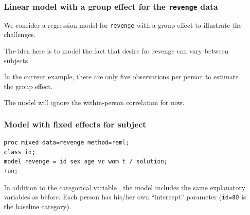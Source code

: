\documentclass{beamer}
\begin{document}
\begin{frame}
\frametitle{Linear model with a group effect for the \texttt{revenge} data}
We consider a regression model for \texttt{revenge} with a group effect to illustrate the challenges.
\bi
\item The idea here is to model the fact that desire for revenge can vary between subjects.
\item In the current example, there are only five observations per person to estimate the group effect.
\item The model will ignore the within-person correlation for now.
\ei
\end{frame}




\begin{frame}[fragile]
\frametitle{Model with fixed effects for subject}
\begin{tcolorbox}[colback=white, colframe=hecblue, title=\SASlang{} code to fit a linear model via REML]
\begin{verbatim}
proc mixed data=revenge method=reml; 
class id; 
model revenge = id sex age vc wom t / solution; 
run;
\end{verbatim}
\end{tcolorbox}
{\footnotesize In addition to the categorical variable , the model includes the same explanatory variables as before. Each person has his/her own ``intercept'' parameter (\texttt{id=80} is the baseline category). 


}
\end{frame}
\end{document}
